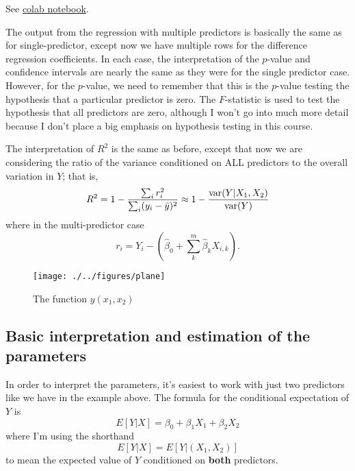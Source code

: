 \begin{example}
See \href{https://colab.research.google.com/drive/1oIRgP_7-c5DGV1D2iz5nj406mZfJxUIG?usp=sharing}{colab notebook}. 
\end{example}

The output from the regression with multiple predictors is basically the same as for single-predictor, except now we have multiple rows for the difference regression coefficients. In each case, the interpretation of the $p$-value and confidence intervals are nearly the same as they were for the single predictor case. However, for the $p$-value, we need to remember that this is the $p$-value testing the hypothesis that a particular predictor is zero. The $F$-statistic is used to test the hypothesis that all predictors are zero, although I won't go into much more detail because I don't place a big emphasis on hypothesis testing in this course. 

 The interpretation of $R^2$ is the same as before, except that now we are considering the ratio of the variance conditioned on ALL predictors to the overall variation in $Y$; that is, 
\begin{equation*}
R^2 = 1 - \frac{\sum_i r_i^2}{\sum_i (y_i - \bar{y})^2}    \approx 1 - \frac{{\rm var}(Y|X_1,X_2)}{{\rm var}(Y)}
\end{equation*} 
where in the multi-predictor case 
\begin{equation}
r_i = Y_i - \left(\hat{\beta}_0 + \sum_k^m \hat{\beta}_kX_{i,k}\right). 
\end{equation} 



\begin{figure}[h!]
    \centering
    \texttt{[image: ./../figures/plane]}
    \caption{The function $y(x_1,x_2)$}
    \label{fig:plane}
\end{figure}

\subsection{Basic interpretation and estimation of the parameters }
 In order to interpret the parameters, it's easiest to work with just two predictors like we have in the example above. The formula for the conditional expectation of $Y$ is 
\begin{equation}\label{eq:2dsurface}
E[Y|X] = \beta_0 + \beta_1X_1 + \beta_2X_2
\end{equation}
where I'm using the shorthand 
\begin{equation*}
E[Y|X] = E[Y|(X_1,X_2)]
\end{equation*}
to mean the expected value of $Y$ conditioned on {\bf both} predictors. 



